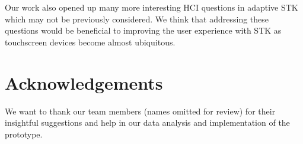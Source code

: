 \documentclass{sigchi}
\begin{document}
Our work also opened up many more interesting HCI questions in adaptive STK
which may not be previously considered. We think that addressing these questions
would be beneficial to improving the user experience with STK as touchscreen
devices become almost ubiquitous.

\section{Acknowledgements}
We want to thank our team members (names omitted for review) for their insightful
suggestions and help in  our data analysis and implementation of the prototype.
\balance
\small


\end{document}
